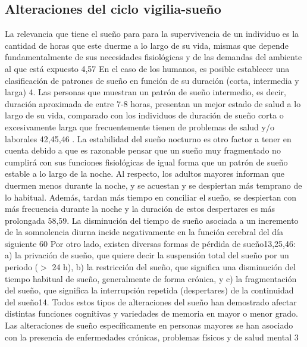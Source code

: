 \documentclass[12pt,a4paper]{mitthesis}
\begin{document}

\subsection{Alteraciones del ciclo vigilia-sueño}

La relevancia que tiene el sueño para para la supervivencia de un individuo es la cantidad de horas que este duerme a lo largo de su vida, mismas que depende fundamentalmente de sus necesidades fisiológicas y de las demandas del ambiente al que está expuesto 4,57
 En el caso de los humanos, es posible establecer una clasificación de patrones de sueño en función de su duración (corta, intermedia y larga) 4. Las personas que muestran un patrón de sueño intermedio, es decir, duración aproximada de entre 7-8 horas, presentan un mejor estado de salud a lo largo de su vida, comparado con los individuos de duración de sueño corta o excesivamente larga que frecuentemente tienen de problemas de salud y/o laborales 42,45,46 . 
La estabilidad del sueño nocturno es otro factor a tener en cuenta debido a que es razonable pensar que un sueño muy fragmentado no cumplirá con sus funciones fisiológicas de igual forma que un patrón de sueño estable a lo largo de la noche. Al respecto, los adultos mayores informan que duermen menos durante la noche, y se acuestan y se despiertan más temprano de lo habitual. Además, tardan más tiempo en conciliar el sueño, se despiertan con más frecuencia durante la noche y la duración de estos despertares es más prolongada 58,59.
La disminución del tiempo de sueño asociada a un incremento de la somnolencia diurna incide negativamente en la función cerebral del día siguiente 60
Por otro lado, existen diversas formas de pérdida de sueño13,25,46: a) la privación de sueño, que quiere decir la suspensión total del sueño por un periodo ($>$ 24 h), b) la restricción del sueño, que significa una disminución del tiempo habitual de sueño, generalmente de forma crónica, y c) la fragmentación del sueño, que significa la interrupción repetida (despertares) de la continuidad del sueño14. Todos estos tipos de alteraciones del sueño han demostrado afectar distintas funciones cognitivas y variedades de memoria en mayor o menor grado.
Las alteraciones de sueño específicamente en personas mayores se han asociado con la presencia de enfermedades crónicas, problemas físicos y de salud mental 3

\end{document}
